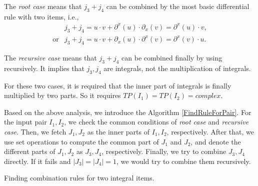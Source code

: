 The \emph{root case} means that $j_3+j_4$ can be combined by the most basic differential rule with two items, i.e., 
\begin{equation}
\begin{array}{rl}
& j_3+j_4=u \cdot v+\partial^x(u)\cdot \partial_x(v) = \partial^x(u)\cdot v, \\
\text{or}& j_3+j_4=u \cdot v+\partial_x(u)\cdot \partial^x(v) = \partial^x(v)\cdot u.
\end{array}
\label{root_form}
\end{equation}

The \emph{recursive case} means that $j_3+j_4$ can be combined  finally by using   recursively. It implies that $j_3,j_4$ are integrals, not the multiplication of integrals.

For these two cases, it is required that the inner part of integrals is finally multiplied by two parts. So it requires $TP(I_1)=TP(I_2)=complex$.  

Based on the above analysis, we introduce the Algorithm \ref{FindRuleForPair}. For the input pair $I_1,I_2$, we check the common conditions of \emph{root case} and \emph{recursive case}. Then, we fetch $J_1,J_2$ as the inner parts of $I_1,I_2$, respectively. After that, we use set operations to compute the common part of $J_1$ and $J_2$, and denote the different parts of $J_1,J_2$ as $J_3,J_4$, respectively. Finally, we try to combine $J_3,J_4$ directly. If it fails and $|J_3|=|J_4|=1$, we would try to combine them recursively.  

\begin{algorithm}
\caption{Finding combination rules for two integral items.}
\label{FindRuleForPair}
\end{algorithm}


